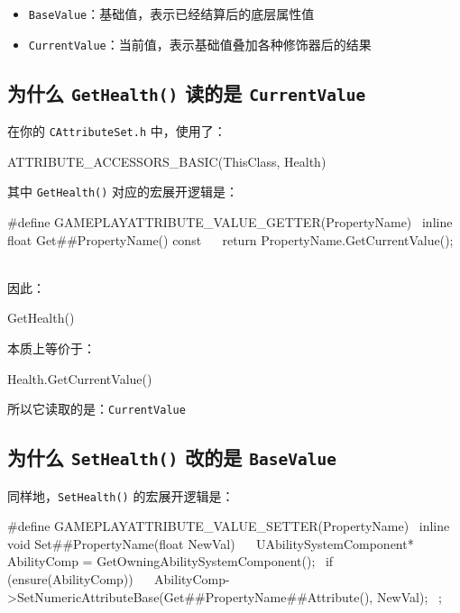 \begin{itemize}
	\item \texttt{BaseValue}：基础值，表示已经结算后的底层属性值
	\item \texttt{CurrentValue}：当前值，表示基础值叠加各种修饰器后的结果
\end{itemize}

\subsection{为什么 \texttt{GetHealth()} 读的是 \texttt{CurrentValue}}

在你的 \texttt{CAttributeSet.h} 中，使用了：

\begin{code}[language=C++]
	ATTRIBUTE_ACCESSORS_BASIC(ThisClass, Health)
\end{code}

其中 \texttt{GetHealth()} 对应的宏展开逻辑是：

\begin{code}[language=C++]
	#define GAMEPLAYATTRIBUTE_VALUE_GETTER(PropertyName) \
	inline float Get##PropertyName() const \
	{ \
		return PropertyName.GetCurrentValue(); \
	}
\end{code}

因此：

\begin{code}[language=C++]
	GetHealth()
\end{code}

本质上等价于：

\begin{code}[language=C++]
	Health.GetCurrentValue()
\end{code}

所以它读取的是：\texttt{CurrentValue}


\subsection{为什么 \texttt{SetHealth()} 改的是 \texttt{BaseValue}}

同样地，\texttt{SetHealth()} 的宏展开逻辑是：

\begin{code}[language=C++]
	#define GAMEPLAYATTRIBUTE_VALUE_SETTER(PropertyName) \
	inline void Set##PropertyName(float NewVal) \
	{ \
		UAbilitySystemComponent* AbilityComp = GetOwningAbilitySystemComponent(); \
		if (ensure(AbilityComp)) \
		{ \
			AbilityComp->SetNumericAttributeBase(Get##PropertyName##Attribute(), NewVal); \
		}; \
	}
\end{code}

